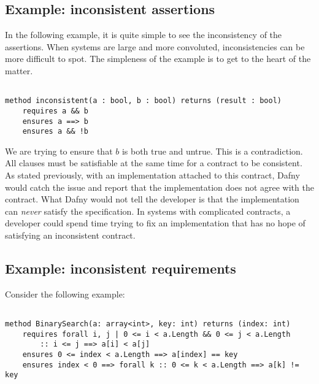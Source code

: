 \documentclass{article}
\newif\ifcomments
\newcommand{\egm}[1]{\ifcomments\textcolor{orange}{egm: #1}\fi}
\begin{document}
\subsection*{Example: inconsistent assertions}

In the following example, it is quite simple to see the inconsistency of the assertions. When systems are large and more
convoluted, inconsistencies can be more difficult to spot. The simpleness of the example is to get to the heart of the matter.

\begin{lstlisting}

method inconsistent(a : bool, b : bool) returns (result : bool)
    requires a && b
    ensures a ==> b
    ensures a && !b

\end{lstlisting}

We are trying to ensure that \(b\) is both true and untrue. This is a contradiction. All clauses must be satisfiable
at the same time for a contract to be consistent. As stated previously, with an implementation attached to this contract,
Dafny would catch the issue and report that the implementation does not agree with the contract. What Dafny would not
tell the developer is that the implementation can {\it never} satisfy the specification. In systems with complicated
contracts, a developer could spend time trying to fix an implementation that has no hope of satisfying an inconsistent
contract.
\egm{The premise is that this analysis is agnostic to the implementation, so when discussing examples, it might be wise to differentiate between implementing the contract and using the contract in a calling context. For example, if I use a method with a contract with a contradiction, either the pre-condition is always violated or Dafny can prove anything about the post-state. That is the observed consequence of contradictions. Maybe make that more clear in the example and text? Also, maybe move the example the beginning of the subsection?}

\subsection*{Example: inconsistent requirements}

Consider the following example:

\begin{lstlisting}

method BinarySearch(a: array<int>, key: int) returns (index: int)
    requires forall i, j | 0 <= i < a.Length && 0 <= j < a.Length
        :: i <= j ==> a[i] < a[j]
    ensures 0 <= index < a.Length ==> a[index] == key
    ensures index < 0 ==> forall k :: 0 <= k < a.Length ==> a[k] != key

\end{lstlisting}
\end{document}
